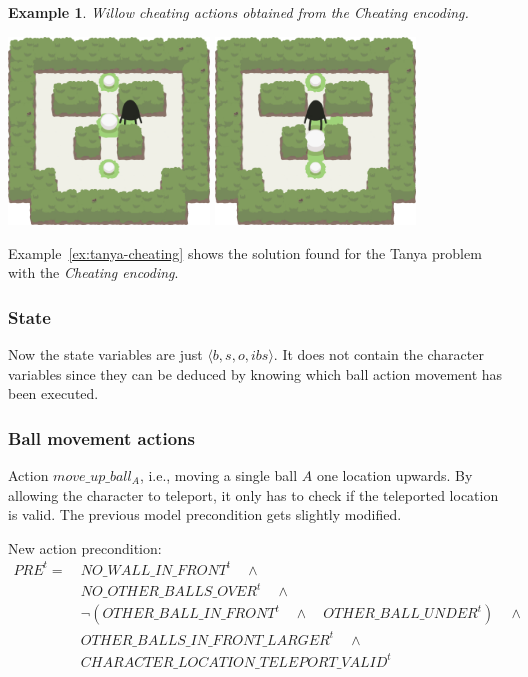 \documentclass{report}
\theoremstyle{plain}
\newtheorem{example}{Example}[section]
\begin{document}
\begin{example} \label{ex:willow-cheating}
Willow cheating actions obtained from the \emph{Cheating encoding}.

\begin{center}
\includegraphics[width=0.4\textwidth]{willow-cheating-1.png}
\includegraphics[width=0.4\textwidth]{willow-cheating-3.png}
\end{center}
\end{example}

Example~\ref{ex:tanya-cheating} shows the solution found for the Tanya problem with the \emph{Cheating encoding}.

\subsubsection{State}
Now the state variables are just $\langle b, s, o, ibs\rangle$. It does not contain the character variables since they can be deduced by knowing which ball action movement has been executed.

\subsubsection{Ball movement actions}
Action $move\_up\_ball_A$, i.e., moving a single ball $A$ one location upwards. By allowing the character to teleport, it only has to check if the teleported location is valid. The previous model precondition gets slightly modified.

New action precondition:
\begin{align*}
PRE^t = \ & NO\_WALL\_IN\_FRONT^t\quad \wedge \\
& NO\_OTHER\_BALLS\_OVER^t \quad \wedge \\
& \lnot (OTHER\_BALL\_IN\_FRONT^t \quad \wedge \quad OTHER\_BALL\_UNDER^t) \quad \wedge \\
& OTHER\_BALLS\_IN\_FRONT\_LARGER^t \quad \wedge \\
& CHARACTER\_LOCATION\_TELEPORT\_VALID^t
\end{align*}
\end{document}
